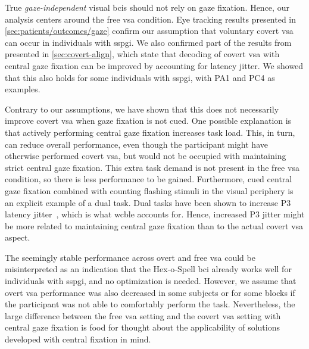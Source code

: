\documentclass[twocolumn]{article}
\begin{document}
True \emph{gaze-independent} visual \acp{bci} should not rely on gaze fixation.
Hence, our analysis centers around the free \ac{vsa} condition.
Eye tracking results presented in \cref{sec:patients/outcomes/gaze}
confirm our assumption that voluntary covert \ac{vsa} can
occur in individuals with \ac{sspgi}.
We also confirmed part of the results from~\textcite{VanDenKerchove2024}
presented in \cref{sec:covert-align}, which state that decoding of covert \ac{vsa} with central gaze
fixation can be improved by accounting for latency jitter. We showed that this
also holds for some individuals with \ac{sspgi}, with PA1 and PC4 as examples.

Contrary to our assumptions, we have shown that this does not
necessarily improve covert \ac{vsa} when gaze fixation is not cued.
One possible explanation is that actively performing central gaze fixation
increases task load.
This, in turn, can reduce overall performance, even though the participant might
have otherwise performed covert \ac{vsa}, but would not be occupied with
maintaining strict central gaze fixation.
This extra task demand is not present in the free \ac{vsa} condition, so
there is less performance to be gained.
Furthermore, cued central gaze fixation combined with counting flashing stimuli
in the visual periphery is an explicit example of a dual task.
Dual tasks have been shown to increase P3 latency
jitter~\cite{Polich2007,Arico2014, VanDenKerchove2024},
which is what \ac{wcble} accounts for.
Hence, increased P3 jitter might be more related to maintaining central gaze fixation
than to the actual covert \ac{vsa} aspect.

The seemingly stable performance across overt and free \ac{vsa} could be
misinterpreted as an indication that the Hex-o-Spell \ac{bci} already works
well for individuals with \ac{sspgi}, and no optimization is
needed.
However, we assume that overt \ac{vsa} performance was also decreased in some
subjects or for some blocks if the participant was not able to comfortably
perform the task.
Nevertheless, the large difference between the free \ac{vsa} setting and the
covert \ac{vsa} setting
with central gaze fixation is food for thought about the applicability of
solutions developed with central fixation in mind.
\end{document}
